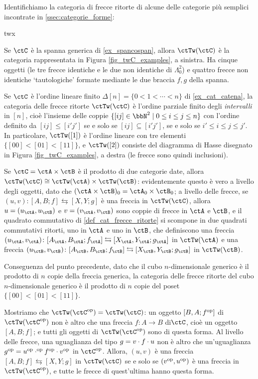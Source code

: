 \begin{examples}\label{ex_twC_examples}
  Identifichiamo la categoria di frecce ritorte di alcune delle categorie più semplici incontrate in \ref{ssec:categorie_forme}:
  \begin{enumtag}{twx}
    \item \label{twex_1} Se $\ctC$ è la spanna generica di \ref{ex_spancospan}, allora $\ctTw(\ctC)$ è la categoria rappresentata in Figura \ref{fig_twC_examples}, a sinistra. Ha cinque oggetti (le tre frecce identiche e le due non identiche di $\Lambda^2_0$) e quattro frecce non identiche `tautologiche' formate mediante le due braccia $f,g$ della spanna.
    \item \label{twex_2} Se $\ctC$ è l'ordine lineare finito $\Delta[n]=\{0 < 1 < \cdots < n\}$ di \ref{ex_cat_catena}, la categoria delle frecce ritorte $\ctTw(\ctC)$ è l'ordine parziale finito degli \emph{intervalli} in $[n]$, cioè l'insieme delle coppie \(\{[ij]\in\bbN^2 \mid 0\le i\le j\le n\}\) con l'ordine definito da \([ij]\le [i'j']\) se e solo se $[ij] \subseteq [i'j']$, se e solo se \(i'\le i \le j\le j'\). In particolare, $\ctTw([1])$ è l'ordine lineare con tre elementi \(\{[00]<[01]<[11]\}\), e $\ctTw([2])$ consiste del diagramma di Hasse disegnato in Figura \ref{fig_twC_examples}, a destra (le frecce sono quindi inclusioni).
    \item \label{twex_3} Se $\ctC = \ctA \times \ctB$ è il prodotto di due categorie date, allora \(\ctTw(\ctC) \cong \ctTw(\ctA) \times \ctTw(\ctB)\): evidentemente questo è vero a livello degli oggetti, dato che $(\ctA\times\ctB)_0=\ctA_0\times\ctB_0$; a livello delle frecce, se \((u,v) \colon [A,B;f]\leftrightarrows [X,Y;g]\) è una freccia in \(\ctTw(\ctC)\), allora \(u=(u_\ctA,u_\ctB)\) e \(v=(v_\ctA,v_\ctB)\) sono coppie di frecce in \(\ctA\) e \(\ctB\), e il quadrato commutativo di \ref{def_cat_frecce_ritorte} si scompone in due quadrati commutativi ritorti, uno in \(\ctA\) e uno in \(\ctB\), che definiscono una freccia \((u_\ctA,v_\ctA) \colon [A_\ctA,B_\ctA;f_\ctA]\leftrightarrows [X_\ctA,Y_\ctA;g_\ctA]\) in \(\ctTw(\ctA)\) e una freccia \((u_\ctB,v_\ctB) \colon [A_\ctB,B_\ctB;f_\ctB]\leftrightarrows [X_\ctB,Y_\ctB;g_\ctB]\) in \(\ctTw(\ctB)\).
    \item \label{twex_4} Conseguenza del punto precedente, dato che il cubo $n$-dimensionale generico è il prodotto di $n$ copie della freccia generica, la categoria delle frecce ritorte del cubo $n$-dimensionale generico è il prodotto di $n$ copie del poset $\{[00]<[01]<[11]\}$.
    \item \label{twex_5} Mostriamo che $\ctTw(\ctC^\op) = \ctTw(\ctC)$: un oggetto $[B,A;f^{\text{op}}]$ di $\ctTw(\ctC^\op)$ non è altro che una freccia $f : A \to B$ di$\ctC$, cioè un oggetto $[A,B;f]$; e tutti gli oggetti di $\ctTw(\ctC^\op)$ sono di questa forma. Al livello delle frecce, una uguaglianza del tipo $g = v\cdot f \cdot u$ non è altro che un'uguaglianza $g^{\text{op}} = u^{\text{op}}\cdot^{\text{op}} f^{\text{op}} \cdot v^{\text{op}}$ in $\ctC^\op$. Allora, $(u,v)$ è una freccia $[A,B;f] \leftrightarrows [X,Y;g]$ in $\ctTw(\ctC)$ se e solo se $(v^{\text{op}},u^{\text{op}})$ è una freccia in $\ctTw(\ctC^\op)$, e tutte le frecce di quest'ultima hanno questa forma.


\end{enumtag}
\end{examples}
